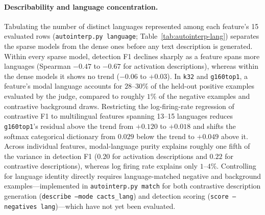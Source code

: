 \paragraph{Describability and language concentration.} Tabulating the
number of distinct languages represented among each feature's 15 evaluated
rows (\texttt{autointerp.py language}; Table~\ref{tab:autointerp-lang})
separates the sparse models from the dense ones before any text
description is generated. Within every sparse model, detection F1 declines
sharply as a feature spans more languages (Spearman $-0.47$ to $-0.67$ for
activation descriptions), whereas within the dense models it shows no
trend ($-0.06$ to $+0.03$). In \texttt{k32} and \texttt{g160top1}, a
feature's modal language accounts for $28$--$30\%$ of the held-out
positive examples evaluated by the judge, compared to roughly $1\%$ of the
negative examples and contrastive background draws. Restricting the
log-firing-rate regression of contrastive F1 to multilingual features
spanning 13--15 languages reduces \texttt{g160top1}'s residual above the
trend from $+0.120$ to $+0.018$ and shifts the softmax categorical
dictionary from $0.029$ below the trend to $+0.049$ above it. Across
individual features,
modal-language purity explains roughly one fifth of the variance in
detection F1 ($0.20$ for activation descriptions and $0.22$ for
contrastive descriptions), whereas log firing rate explains only
$1$--$4\%$. Controlling for language identity directly requires
language-matched negative and background examples---implemented in
\texttt{autointerp.py match} for both contrastive description generation
(\texttt{describe --mode cacts\_lang}) and detection scoring
(\texttt{score --negatives lang})---which have not yet been evaluated.


